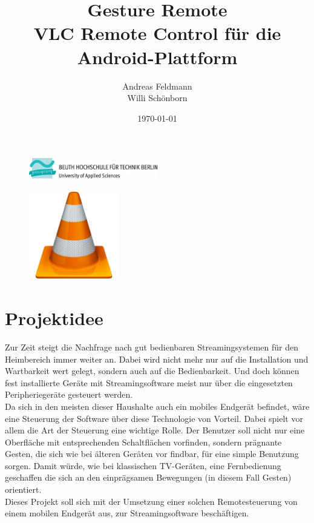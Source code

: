 \documentclass[a4paper,12pt]{article}
\title{Gesture Remote \\ VLC Remote Control für die Android-Plattform}
\author{Andreas Feldmann \\ Willi Schönborn}
\date{\today}
\begin{document}
\begin{figure}[H]
\centering
\includegraphics[width=0.5\textwidth]{beuth.eps}
\maketitle
\end{figure}

\begin{figure}[H]
\centering
\includegraphics[width=0.35\textwidth]{vlc.png}
\end{figure}

\newpage
\tableofcontents

\newpage
\section{Projektidee}
Zur Zeit steigt die Nachfrage nach gut bedienbaren Streamingsystemen für den Heimbereich immer weiter an. Dabei wird nicht mehr nur auf die Installation und Wartbarkeit wert gelegt, sondern auch auf die Bedienbarkeit. Und doch können fest installierte Geräte mit Streamingsoftware meist nur über die eingesetzten Peripheriegeräte gesteuert werden. \\
Da sich in den meisten dieser Haushalte auch ein mobiles Endgerät befindet, wäre eine Steuerung der Software über diese Technologie von Vorteil. Dabei spielt vor allem die Art der Steuerung eine wichtige Rolle. Der Benutzer soll nicht nur eine Oberfläche mit entsprechenden Schaltflächen vorfinden, sondern prägnante Gesten, die sich wie bei älteren Geräten vor findbar, für eine simple Benutzung sorgen. Damit würde, wie bei klassischen TV-Geräten, eine Fernbedienung geschaffen die sich an den einprägsamen Bewegungen (in diesem Fall Gesten) orientiert. \\
Dieses Projekt soll sich mit der Umsetzung einer solchen Remotesteuerung von einem mobilen Endgerät aus, zur Streamingsoftware beschäftigen.
\end{document}
